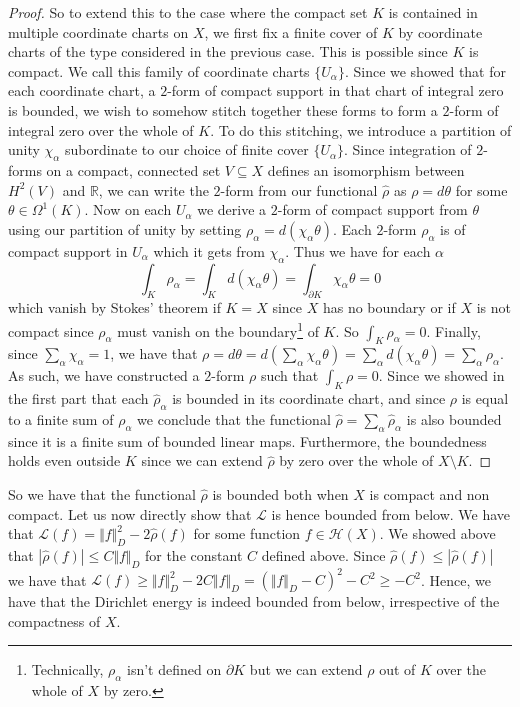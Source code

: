 \documentclass[11pt]{report}
\theoremstyle{definition}
\begin{document}
\begin{proof}
  So to extend this to the case where the compact set $K$ is contained in multiple coordinate charts on $X$, we first fix a finite cover of $K$ by coordinate charts of the type considered in the previous case. This is possible since $K$ is compact. We call this family of coordinate charts $\{U_{\alpha}\}$. Since we showed that for each coordinate chart, a $2$-form of compact support in that chart of integral zero is bounded, we wish to somehow stitch together these forms to form a $2$-form of integral zero over the whole of $K$. To do this stitching, we introduce a partition of unity $\chi_{\alpha}$ subordinate to our choice of finite cover $\{U_{\alpha}\}$. Since integration of $2$-forms on a compact, connected set $V \subseteq X$ defines an isomorphism between $H^2(V)$ and $\mathbb{R}$, we can write the $2$-form from our functional $\hat{\rho}$ as $\rho = d\theta$ for some $\theta \in \Omega^1(K)$. Now on each $U_{\alpha}$ we derive a $2$-form of compact support from $\theta$ using our partition of unity by setting $\rho_{\alpha} = d(\chi_{\alpha}\theta)$. Each $2$-form $\rho_{\alpha}$ is of compact support in $U_{\alpha}$ which it gets from $\chi_{\alpha}$. Thus we have for each $\alpha$
  \[ \int_K\rho_{\alpha} = \int_K d(\chi_{\alpha}\theta) = \int_{\partial K} \chi_{\alpha}\theta = 0 \]
  which vanish by Stokes' theorem if $K=X$ since $X$ has no boundary or if $X$ is not compact since $\rho_\alpha$ must vanish on the boundary\footnote{Technically, $\rho_{\alpha}$ isn't defined on $\partial K$ but we can extend $\rho$ out of $K$ over the whole of $X$ by zero.} of $K$. So $\int_K \rho_{\alpha} = 0$. Finally, since $\sum_{\alpha} \chi_{\alpha} = 1$, we have that 
  $ \rho = d\theta = d\left(\sum_{\alpha}\chi_{\alpha}\theta\right) = \sum_{\alpha}d(\chi_{\alpha}\theta) = \sum_{\alpha}\rho_{\alpha}$.
  As such, we have constructed a $2$-form $\rho$ such that $\int_K \rho = 0$. Since we showed in the first part that each $\hat{\rho}_{\alpha}$ is bounded in its coordinate chart, and since $\rho$ is equal to a finite sum of $\rho_{\alpha}$ we conclude that the functional $\hat{\rho} = \sum_{\alpha}\hat{\rho}_{\alpha}$ is also bounded since it is a finite sum of bounded linear maps. Furthermore, the boundedness holds even outside $K$ since we can extend $\hat{\rho}$ by zero over the whole of $X\setminus K$.
\end{proof}

So we have that the functional $\hat{\rho}$ is bounded both when $X$ is compact and non compact. Let us now directly show that $\mathcal{L}$ is hence bounded from below. We have that $\mathcal{L}(f) = \Vert f \Vert^2_D -2\hat{\rho}(f) $ for some function $f \in \mathcal{H}(X)$. We showed above that $|\hat{\rho}(f)| \leq C \Vert f \Vert_D$ for the constant $C$ defined above. Since $\hat{\rho}(f) \leq |\hat{\rho}(f)|$ we have that $ \mathcal{L}(f) \geq \Vert f \Vert^2_D -2C \Vert f \Vert_D = (\Vert f \Vert_D - C)^2 - C^2 \geq - C^2$. Hence, we have that the Dirichlet energy is indeed bounded from below, irrespective of the compactness of $X$.
\end{document}
